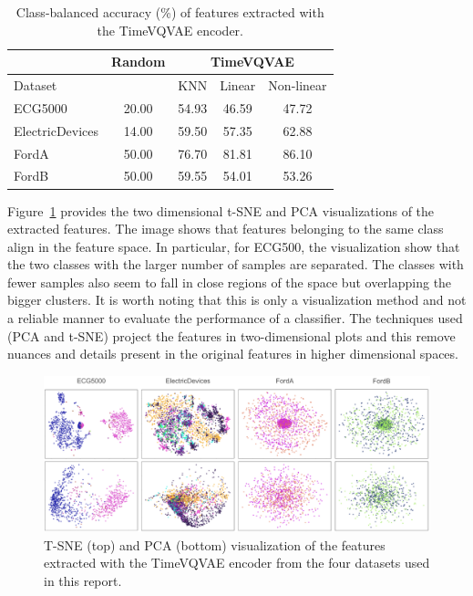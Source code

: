 \begin{table}[h]
    \centering           
    \caption{ \label{tab:exp_vqvae_2} Class-balanced accuracy (\%) of features extracted with the TimeVQVAE encoder.}
    \begin{tabular}{lcccc}
        \hline 
        { } & {Random} &  \multicolumn{3}{c}{TimeVQVAE}\tabularnewline
        \hline 
        {Dataset} & {} &  \multicolumn{1}{|c}{KNN} & {Linear} & \multicolumn{1}{c}{Non-linear} \tabularnewline
         \hline
        ECG5000 & {20.00} &  54.93 & 46.59 & 47.72 \tabularnewline
        ElectricDevices & {14.00} &  59.50 & 57.35 & 62.88 \tabularnewline
        FordA & {50.00} &  76.70 & 81.81 & 86.10 \tabularnewline
        FordB & {50.00} &  59.55 & 54.01 & 53.26 \tabularnewline
        \hline
    \end{tabular} 
\end{table}

Figure~\ref{fig:exp_vqvae_3} provides the two dimensional t-SNE and PCA visualizations of the extracted features. The image shows that features belonging to the same class align in the feature space. In particular, for ECG500, the visualization show that the two classes with the larger number of samples are separated. The classes with fewer samples also seem to fall in close regions of the space but overlapping the bigger clusters. It is worth noting that this is only a visualization method and not a reliable manner to evaluate the performance of a classifier. The techniques used (PCA and t-SNE) project the features in two-dimensional plots and this remove nuances and details present in the original features in higher dimensional spaces.

\begin{figure}[h]
    \centering
    \includegraphics[width=0.95\columnwidth]{fig_featureextract/timeVQAE-tse-pca.png}  
    \caption[T-SNE and PCA visualization of TimeVQVAE features]{\label{fig:exp_vqvae_3} T-SNE (top) and PCA (bottom) visualization of the features extracted with the TimeVQVAE encoder from the four datasets used in this report.}
\end{figure}
   
